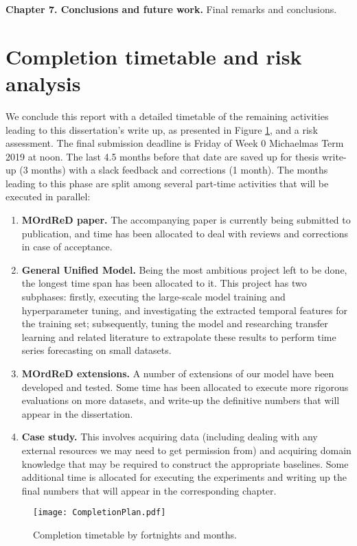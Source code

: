 \documentclass[pdftex,12pt,a4paper]{article}
\theoremstyle{definition}
\theoremstyle{remark}
\begin{document}
\textbf{Chapter 7. Conclusions and future work.} Final remarks and conclusions. 

\section{Completion timetable and risk analysis}
We conclude this report with a detailed timetable of the remaining activities leading to this dissertation's write up, as presented in Figure \ref{fig:timetable}, and a risk assessment. The final submission deadline is Friday of Week 0 Michaelmas Term 2019 at noon. The last 4.5 months before that date are saved up for thesis write-up (3 months) with a slack feedback and corrections (1 month). The months leading to this phase are split among several part-time activities that will be executed in parallel:

\begin{enumerate}
    \item \textbf{MOrdReD paper.} The accompanying paper is currently being submitted to publication, and time has been allocated to deal with reviews and corrections in case of acceptance.
    \item \textbf{General Unified Model.} Being the most ambitious project left to be done, the longest time span has been allocated to it. This project has two subphases: firstly, executing the large-scale model training and hyperparameter tuning, and investigating the extracted temporal features for the training set; subsequently, tuning the model and researching transfer learning and related literature to extrapolate these results to perform time series forecasting on small datasets.
    \item \textbf{MOrdReD extensions.} A number of extensions of our model have been developed and tested. Some time has been allocated to execute more rigorous evaluations on more datasets, and write-up the definitive numbers that will appear in the dissertation.
    \item \textbf{Case study.} This involves acquiring data (including dealing with any external resources we may need to get permission from) and acquiring domain knowledge that may be required to construct the appropriate baselines. Some additional time is allocated for executing the experiments and writing up the final numbers that will appear in the corresponding chapter.
\end{enumerate}

\begin{figure}
    \centerline{\texttt{[image: CompletionPlan.pdf]}}
    \caption{Completion timetable by fortnights and months.}
	\label{fig:timetable}
\end{figure}
\end{document}
